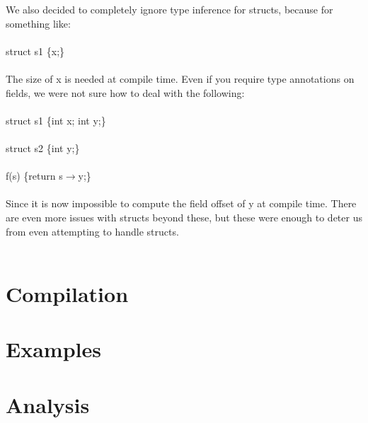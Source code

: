 \documentclass{article}
\begin{document}
We also decided to completely ignore type inference for structs, because for something like:\\
\\
struct s1 \{x;\}\\
\\
The size of x is needed at compile time. Even if you require type annotations on fields, we were not sure how to deal with the following:\\
\\
struct s1 \{int x; int y;\}\\
\\
struct s2 \{int y;\}\\
\\
f(s) \{return s$\to$y;\}\\
\\
Since it is now impossible to compute the field offset of y at compile time. There are even more issues with structs beyond these, but these were enough to deter us from even attempting to handle structs.\\
\\

\section{Compilation}

\section{Examples}

\section{Analysis}
\end{document}
